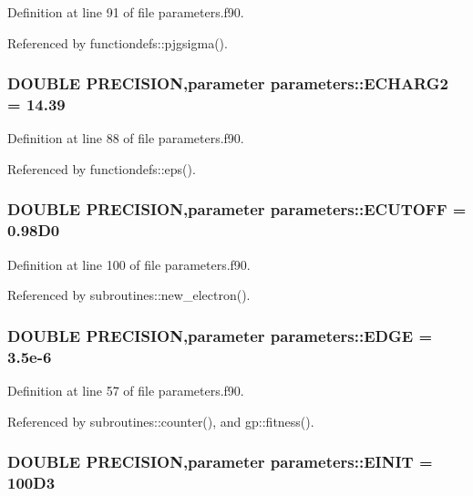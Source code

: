 Definition at line 91 of file parameters.f90.

Referenced by functiondefs::pjgsigma().\hypertarget{namespaceparameters_a3012689c3933acd7a66b7268835760a1}{
\subsubsection[{ECHARG2}]{\setlength{\rightskip}{0pt plus 5cm}DOUBLE PRECISION,parameter {\bf parameters::ECHARG2} = 14.39}}
\label{namespaceparameters_a3012689c3933acd7a66b7268835760a1}


Definition at line 88 of file parameters.f90.

Referenced by functiondefs::eps().\hypertarget{namespaceparameters_a9536b89e2089876959d4d367fbd7fd89}{
\subsubsection[{ECUTOFF}]{\setlength{\rightskip}{0pt plus 5cm}DOUBLE PRECISION,parameter {\bf parameters::ECUTOFF} = 0.98D0}}
\label{namespaceparameters_a9536b89e2089876959d4d367fbd7fd89}


Definition at line 100 of file parameters.f90.

Referenced by subroutines::new\_\-electron().\hypertarget{namespaceparameters_a45377074e21edf9bd71351430490cd5e}{
\subsubsection[{EDGE}]{\setlength{\rightskip}{0pt plus 5cm}DOUBLE PRECISION,parameter {\bf parameters::EDGE} = 3.5e-\/6}}
\label{namespaceparameters_a45377074e21edf9bd71351430490cd5e}


Definition at line 57 of file parameters.f90.

Referenced by subroutines::counter(), and gp::fitness().\hypertarget{namespaceparameters_a5f4fb781d85daf37e0a18e15e4dcc9c8}{
\subsubsection[{EINIT}]{\setlength{\rightskip}{0pt plus 5cm}DOUBLE PRECISION,parameter {\bf parameters::EINIT} = 100D3}}
\label{namespaceparameters_a5f4fb781d85daf37e0a18e15e4dcc9c8}


